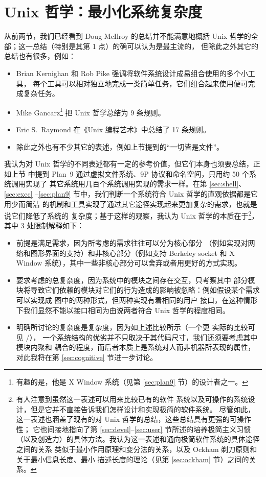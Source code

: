 \section{Unix 哲学：最小化系统复杂度}\label{sec:complex}

从前两节，我们已经看到 Doug McIlroy 的总结并不能满意地概括 Unix
哲学的全部；这一总结（特别是其第 1 点）的确可以认为是最主流的，
但除此之外其它的总结也有很多，例如：
\begin{itemize}
\item Brian Kernighan 和 Rob Pike 强调将软件系统设计成易组合使用的多个小工具，
	每个工具可以相对独立地完成一类简单任务，它们组合起来使用便可完成复杂任务。
\item Mike Gancarz\footnote{有趣的是，他是 X Window 系统（见第
	\ref{sec:plan9} 节）的设计者之一。} 把 Unix 哲学总结为 9 条规则。
\item Eric S.\ Raymond 在《Unix 编程艺术》中总结了 17 条规则。
\item 除此之外也有不少其它的表述，例如上节提到的“一切皆是文件”。
\end{itemize}
我认为对 Unix 哲学的不同表述都有一定的参考价值，但它们本身也须要总结，正如上节
中提到 Plan~9 通过虚拟文件系统、9P 协议和命名空间，只用约 50 个系统调用实现了
其它系统用几百个系统调用实现的需求一样。在第 \ref{sec:shell}、\ref{sec:exec}%
--\ref{sec:plan9} 节中，我们判断一个系统符合 Unix 哲学的直观依据都是它用少而简洁
的机制和工具实现了通过其它途径实现起来更加复杂的需求，也就是说它们降低了系统的
复杂度；基于这样的观察，我认为 Unix 哲学的本质在于\footnote{有人注意到虽然这一表述可以用来比较已有的软件
系统以及可操作的系统设计，但是它并不直接告诉我们怎样设计和实现极简的软件系统。
尽管如此，这一表述也涵盖了现有的对 Unix 哲学的总结，这些总结具有更强的可操作性；
它也间接地指向了第 \ref{sec:devel}--\ref{sec:user} 节所述的培养极简主义习惯
（以及创造力）的具体方法。我认为这一表述和通向极简软件系统的具体途径之间的关系
类似于最小作用原理和变分法的关系，以及 Ockham 剃刀原则和关于最小信息长度、最小
描述长度的理论（见第 \ref{sec:ockham} 节）之间的关系。}，其中 3 处限制解释如下：
\begin{itemize}
\item 前提是满足需求，因为所考虑的需求往往可以分为核心部分
	（例如实现对网络和图形界面的支持）和非核心部分（例如支持 Berkeley socket
	和 X Window 系统），其中一些非核心部分可以舍弃或者用更好的方式实现。
\item 要求考虑的总复杂度，因为系统中的模块之间存在交互，只考察其中
	部分模块将导致它们依赖的模块对它们的行为造成的影响被忽略：例如假设某个需求
	可以实现成 \parencite{litt2014a} 图中的两种形式，但两种实现有着相同的用户
	接口，在这种情形下我们显然不能以接口相同为由说两者符合 Unix 哲学的程度相同。
\item 明确所讨论的复杂度是复杂度，因为如上述比较所示（一个更
	实际的比较可见 \parencite{github:acmetiny}/\parencite{gitea:emca}），
	一个系统结构的优劣并不只取决于其代码尺寸，我们还须要考虑其中模块内聚和
	耦合的程度，而后者本质上是系统对人而非机器所表现的属性，对此我将在第
	\ref{sec:cognitive} 节进一步讨论。
\end{itemize}

